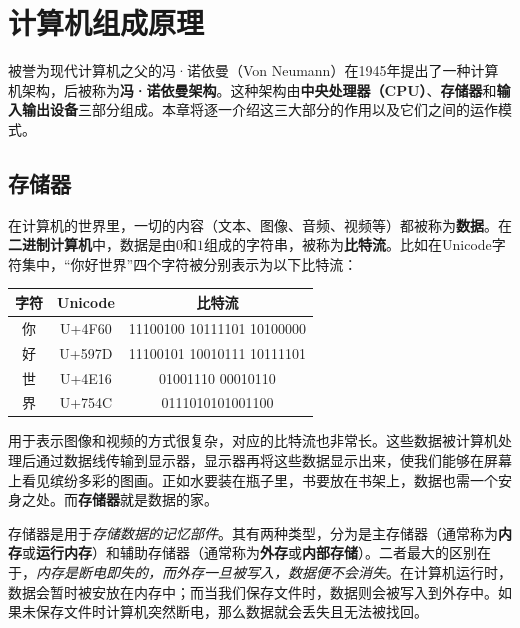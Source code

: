 \chapter{计算机组成原理}\label{ch:arch}

被誉为现代计算机之父的冯·诺依曼（Von Neumann）在1945年提出了一种计算机架构，后被称为\textbf{冯·诺依曼架构}。这种架构由\textbf{中央处理器（CPU）}、\textbf{存储器}和\textbf{输入输出设备}三部分组成。本章将逐一介绍这三大部分的作用以及它们之间的运作模式。


\section{存储器}\label{sec:arch:storage}

在计算机的世界里，一切的内容（文本、图像、音频、视频等）都被称为\textbf{数据}。在\textbf{二进制计算机}中，数据是由$0$和$1$组成的字符串，被称为\textbf{比特流}。比如在Unicode字符集中，“你好世界”四个字符被分别表示为以下比特流：

\begin{center}
    \begin{tabular}{ c c c }
        \hline
        字符 & Unicode & 比特流                        \\
        \hline
        你  & U+4F60  & 11100100 10111101 10100000 \\
        好  & U+597D  & 11100101 10010111 10111101 \\
        世  & U+4E16  & 01001110 00010110          \\
        界  & U+754C  & 0111010101001100           \\
        \hline
    \end{tabular}
\end{center}

用于表示图像和视频的方式很复杂，对应的比特流也非常长。这些数据被计算机处理后通过数据线传输到显示器，显示器再将这些数据显示出来，使我们能够在屏幕上看见缤纷多彩的图画。正如水要装在瓶子里，书要放在书架上，数据也需一个安身之处。而\textbf{存储器}就是数据的家。

存储器是用于\textit{存储数据的记忆部件}。其有两种类型，分为是主存储器（通常称为\textbf{内存}或\textbf{运行内存}）和辅助存储器（通常称为\textbf{外存}或\textbf{内部存储}）。二者最大的区别在于，\textit{内存是断电即失的，而外存一旦被写入，数据便不会消失}。在计算机运行时，数据会暂时被安放在内存中；而当我们保存文件时，数据则会被写入到外存中。如果未保存文件时计算机突然断电，那么数据就会丢失且无法被找回。

